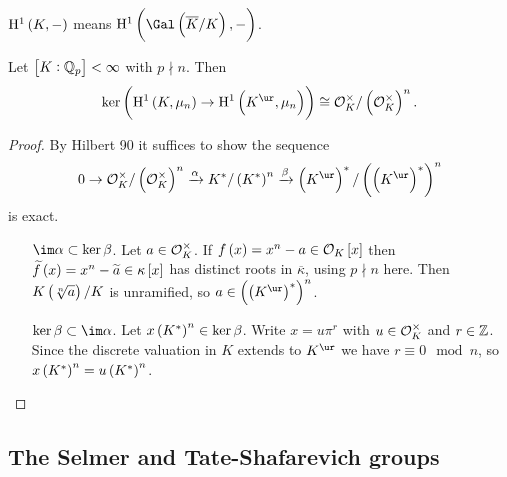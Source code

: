\pagebreak

\begin{notation*}
$ \H^1\br{K, -} $ means $ \H^1\br{\Gal\br{\overline{K} / K}, -} $.
\end{notation*}

\begin{lemma}
\label{lem:15.3}
Let $ \sbr{K : \QQ_p} < \infty $ with $ p \nmid n $. Then
$$ \ker \br{\H^1\br{K, \mu_n} \to \H^1\br{K^{\ur}, \mu_n}} \cong \OOO_K^\times / \br{\OOO_K^\times}^n. $$
\end{lemma}

\begin{proof}
By Hilbert 90 it suffices to show the sequence
$$ 0 \to \OOO_K^\times / \br{\OOO_K^\times}^n \xrightarrow{\alpha} K^* / \br{K^*}^n \xrightarrow{\beta} \br{K^{\ur}}^* / \br{\br{K^{\ur}}^*}^n $$
is exact.
\begin{itemize}[leftmargin=1in]
\item[$ \im \alpha \subset \ker \beta $.] Let $ a \in \mathcal{O}_K^\times $. If $ f\br{x} = x^n - a \in \OOO_K\sbr{x} $ then $ \widetilde{f}\br{x} = x^n - \widetilde{a} \in \kappa\sbr{x} $ has distinct roots in $ \overline{\kappa} $, using $ p \nmid n $ here. Then $ K\br{\sqrt[n]{a}} / K $ is unramified, so $ a \in \br{\br{K^{\ur}}^*}^n $.
\item[$ \ker \beta \subset \im \alpha $.] Let $ x\br{K^*}^n \in \ker \beta $. Write $ x = u\pi^r $ with $ u \in \mathcal{O}_K^\times $ and $ r \in \mathbb{Z} $. Since the discrete valuation in $ K $ extends to $ K^{\ur} $ we have $ r \equiv 0 \mod n $, so $ x\br{K^*}^n = u\br{K^*}^n $.
\end{itemize}
\end{proof}

\subsection{The Selmer and Tate-Shafarevich groups}



